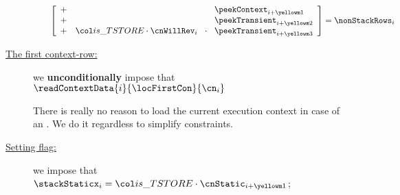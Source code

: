 \begin{description}
\begin{enumerate}
\[					\left[ \begin{array}{crcl}
						+ &                                    &                   & \peekContext   _{i + \locTransientCurrContextRow } \\
						+ &                                    &                   & \peekTransient _{i + \locTransientDoingRow       } \\
						+ & \locIsTstore \cdot \cnWillRev _{i} & \!\!\!\cdot\!\!\! & \peekTransient _{i + \locTransientUndoingRow     } \\
					\end{array} \right]
					=
					\nonStackRows _{i}
				\]
		\end{enumerate}
	\item[\underline{The first context-row:}]
		we \textbf{unconditionally} impose that $\readContextData {i}{\locFirstCon}{\cn_{i}}$

		\saNote{}
		There is really no reason to load the current execution context in case of an \oogxSH{}.
		We do it regardless to simplify constraints.
	\item[\underline{Setting \stackStaticx{} flag:}]
		we impose that
		$\stackStaticx_{i} = \locIsTstore \cdot \cnStatic_{i + \locTransientCurrContextRow}$;


\end{description}
